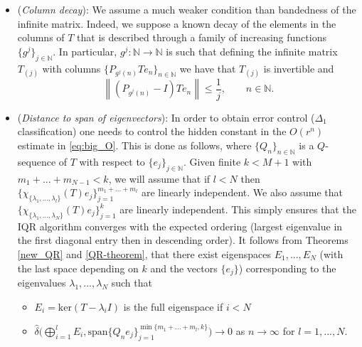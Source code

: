 \documentclass[a4paper,10pt]{article}
\begin{document}
\begin{itemize}
\item[(I)] ({\it Column decay}): We assume a much weaker condition than bandedness of the infinite matrix. Indeed, we suppose a known decay of the elements in the columns of $T$ that is described through a family of increasing functions $\{g^j\}_{j\in \mathbb{N}}$. In particular, $g^j:\mathbb{N}\rightarrow\mathbb{N}$ is such that defining the infinite matrix $T_{(j)}$ with columns $\{P_{g^j(n)}Te_n\}_{n\in\mathbb{N}}$ we have that $T_{(j)}$ is invertible and
\begin{equation}
\label{col_decay2}
\left\|(P_{g^j(n)}-I)Te_n\right\|\leq \frac{1}{j}, \qquad n \in \mathbb{N}.
\end{equation}

\item[(II)] ({\it Distance to span of eigenvectors}): In order to obtain error control ($\Delta_1$ classification) one needs to control the hidden constant in the $O(r^n)$ estimate in \eqref{eq:big_O}. This is done as follows, where $\{Q_n\}_{n\in\mathbb{N}}$ is a $Q$-sequence of $T$ with respect to $\{e_j\}_{j\in\mathbb{N}}$. Given finite $k<M+1$ with $m_1+...+m_{N-1}<k$, we will assume that if $l<N$ then $\{\chi_{\{\lambda_1,...,\lambda_l\}}(T)e_j\}_{j=1}^{m_1+...+m_{l}}$ are linearly independent. We also assume that $\{\chi_{\{\lambda_1,...,\lambda_{N}\}}(T)e_j\}_{j=1}^{k}$ are linearly independent. This simply ensures that the IQR algorithm converges with the expected ordering (largest eigenvalue in the first diagonal entry then in descending order). It follows from Theorems \ref{new_QR} and \ref{QR-theorem}, that there exist eigenspaces $E_1,...,E_{N}$ (with the last space depending on $k$ and the vectors $\{e_j\}$) corresponding to the eigenvalues $\lambda_{1},...,\lambda_{N}$ such that
\begin{itemize}
	\item $E_i=\mathrm{ker}(T-\lambda_i I)$ is the full eigenspace if $i<N$
	\item $\hat\delta\Big(\bigoplus_{i=1}^lE_i,\mathrm{span}\{ Q_ne_{j}\}_{j=1}^{\min\{m_1+...+m_{l},k\}}\Big)\rightarrow 0$ as $n\rightarrow\infty$ for $l=1,...,N$.
\end{itemize}

\end{itemize}
\end{document}
